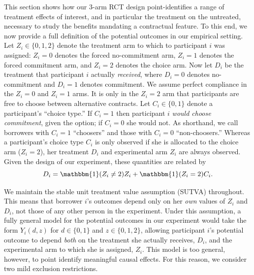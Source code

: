 \documentclass[12pt, a4paper]{article}
\begin{document}
This section shows how our 3-arm RCT design point-identifies a range of treatment effects of interest, and in particular the treatment on the untreated, necessary to study the benefits mandating a contractual feature. To this end, we now provide a full definition of the potential outcomes in our empirical setting. Let $Z_i \in \{0, 1, 2\}$ denote the treatment arm to which to participant $i$ was assigned: $Z_i = 0$ denotes the forced no-commitment arm, $Z_i = 1$ denotes the forced commitment arm, and $Z_i = 2$ denotes the choice arm. 
Now let $D_i$ be the treatment that participant $i$ actually \emph{received}, where $D_i = 0$ denotes no-commitment and $D_i = 1$ denotes commitment. 
We assume perfect compliance in the $Z_i = 0$ and $Z_i = 1$ arms. %
It is only in the $Z_i = 2$ arm that participants are free to choose between alternative contracts. 
Let $C_i \in \{0, 1 \}$ denote a participant's ``choice type.'' If $C_i = 1$ then participant $i$ \emph{would choose commitment}, given the option; if $C_i = 0$ she would not. 
As shorthand, we call borrowers with $C_i = 1$ ``choosers'' and those with $C_i = 0$ ``non-choosers.''
Whereas a participant's choice type $C_i$ is only observed if she is allocated to the choice arm ($Z_i = 2$), her treatment $D_i$ and experimental arm $Z_i$ are always observed. 
Given the design of our experiment, these quantities are related by
\begin{equation}
D_i = \mathbbm{1}(Z_i \neq 2) Z_i + \mathbbm{1}(Z_i = 2) C_i.
\label{eq:potentialTreatments}
\end{equation}

We maintain the stable unit treatment value assumption (SUTVA) throughout. 
This means that borrower $i$'s outcomes depend only on her \emph{own} values of $Z_i$ and $D_i$, not those of any other person in the experiment. 
Under this assumption, a fully general model for the potential outcomes in our experiment would take the form $Y_i(d, z)$ for $d\in \{0,1\}$ and $z \in \{0, 1, 2\}$, allowing participant $i$'s potential outcome to depend \emph{both} on the treatment she actually receives, $D_i$, and the experimental arm to which she is assigned, $Z_i$. 
This model is too general, however, to point identify meaningful causal effects. 
For this reason, we consider two mild exclusion restrictions.
\end{document}
